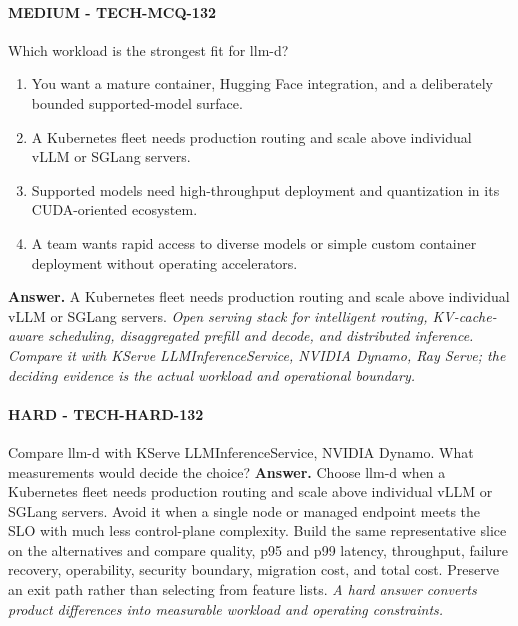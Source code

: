 \paragraph{MEDIUM - TECH-MCQ-132} Which workload is the strongest fit for llm-d?
\begin{enumerate}[label=\Alph*.]
\item You want a mature container, Hugging Face integration, and a deliberately bounded supported-model surface.
\item A Kubernetes fleet needs production routing and scale above individual vLLM or SGLang servers.
\item Supported models need high-throughput deployment and quantization in its CUDA-oriented ecosystem.
\item A team wants rapid access to diverse models or simple custom container deployment without operating accelerators.
\end{enumerate}
\textbf{Answer.} A Kubernetes fleet needs production routing and scale above individual vLLM or SGLang servers.
\textit{Open serving stack for intelligent routing, KV-cache-aware scheduling, disaggregated prefill and decode, and distributed inference. Compare it with KServe LLMInferenceService, NVIDIA Dynamo, Ray Serve; the deciding evidence is the actual workload and operational boundary.}
\paragraph{HARD - TECH-HARD-132} Compare llm-d with KServe LLMInferenceService, NVIDIA Dynamo. What measurements would decide the choice?
\textbf{Answer.} Choose llm-d when a Kubernetes fleet needs production routing and scale above individual vLLM or SGLang servers. Avoid it when a single node or managed endpoint meets the SLO with much less control-plane complexity. Build the same representative slice on the alternatives and compare quality, p95 and p99 latency, throughput, failure recovery, operability, security boundary, migration cost, and total cost. Preserve an exit path rather than selecting from feature lists.
\textit{A hard answer converts product differences into measurable workload and operating constraints.}
